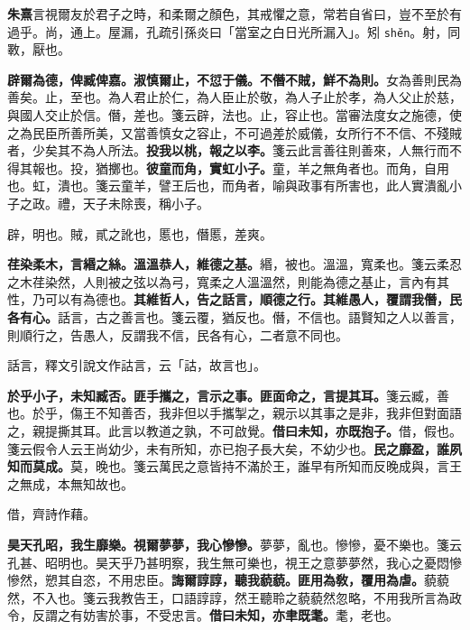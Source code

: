 \begin{quoting}\textbf{朱熹}言視爾友於君子之時，和柔爾之顏色，其戒懼之意，常若自省曰，豈不至於有過乎。尚，通上。屋漏，孔疏引孫炎曰「當室之白日光所漏入」。矧 \texttt{shěn}。射，同斁，厭也。\end{quoting}

\textbf{辟爾為德，俾臧俾嘉。淑慎爾止，不愆于儀。不僭不賊，鮮不為則。}{\footnotesize 女為善則民為善矣。止，至也。為人君止於仁，為人臣止於敬，為人子止於孝，為人父止於慈，與國人交止於信。僭，差也。箋云辟，法也。止，容止也。當審法度女之施德，使之為民臣所善所美，又當善慎女之容止，不可過差於威儀，女所行不不信、不殘賊者，少矣其不為人所法。}\textbf{投我以桃，報之以李。}{\footnotesize 箋云此言善往則善來，人無行而不得其報也。投，猶擲也。}\textbf{彼童而角，實虹小子。}{\footnotesize 童，羊之無角者也。而角，自用也。虹，潰也。箋云童羊，譬王后也，而角者，喻與政事有所害也，此人實潰亂小子之政。禮，天子未除喪，稱小子。}

\begin{quoting}辟，明也。賊，貳之訛也，慝也，僭慝，差爽。\end{quoting}

\textbf{荏染柔木，言緡之絲。溫溫恭人，維德之基。}{\footnotesize 緡，被也。溫溫，寬柔也。箋云柔忍之木荏染然，人則被之弦以為弓，寬柔之人溫溫然，則能為德之基止，言內有其性，乃可以有為德也。}\textbf{其維哲人，告之話言，順德之行。其維愚人，覆謂我僭，民各有心。}{\footnotesize 話言，古之善言也。箋云覆，猶反也。僭，不信也。語賢知之人以善言，則順行之，告愚人，反謂我不信，民各有心，二者意不同也。}

\begin{quoting}話言，釋文引說文作詁言，云「詁，故言也」。\end{quoting}

\textbf{於乎小子，未知臧否。匪手攜之，言示之事。匪面命之，言提其耳。}{\footnotesize 箋云臧，善也。於乎，傷王不知善否，我非但以手攜掣之，親示以其事之是非，我非但對面語之，親提撕其耳。此言以教道之孰，不可啟覺。}\textbf{借曰未知，亦既抱子。}{\footnotesize 借，假也。箋云假令人云王尚幼少，未有所知，亦已抱子長大矣，不幼少也。}\textbf{民之靡盈，誰夙知而莫成。}{\footnotesize 莫，晚也。箋云萬民之意皆持不滿於王，誰早有所知而反晚成與，言王之無成，本無知故也。}

\begin{quoting}借，齊詩作藉。\end{quoting}

\textbf{昊天孔昭，我生靡樂。視爾夢夢，我心慘慘。}{\footnotesize 夢夢，亂也。慘慘，憂不樂也。箋云孔甚、昭明也。昊天乎乃甚明察，我生無可樂也，視王之意夢夢然，我心之憂悶慘慘然，愬其自恣，不用忠臣。}\textbf{誨爾諄諄，聽我藐藐。匪用為敎，覆用為虐。}{\footnotesize 藐藐然，不入也。箋云我教告王，口語諄諄，然王聽聆之藐藐然忽略，不用我所言為政令，反謂之有妨害於事，不受忠言。}\textbf{借曰未知，亦聿既耄。}{\footnotesize 耄，老也。}

